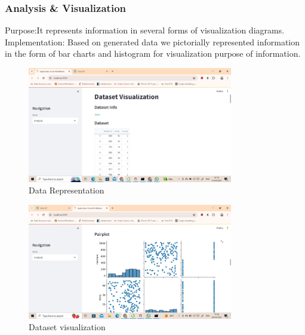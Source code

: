 \documentclass{article}
\begin{document}
\newpage



\subsubsection{Analysis & Visualization }
 
Purpose:It represents information in several forms of visualization diagrams.\\
Implementation: Based on generated data we pictorially represented information in the form of bar charts and histogram for visualization purpose of information.
\\

\begin{figure}[h]
    \centering
    \includegraphics[width=0.8\textwidth]{dataset_visualization.jpg}
    \caption{Data Representation}
    \label{fig:example}
\end{figure}

\begin{figure}[h]
    \centering
    \includegraphics[width=0.8\textwidth]{dataset_visualization1.jpg}
    \caption{Dataset visualization }
    \label{fig:example}
\end{figure}
\end{document}
